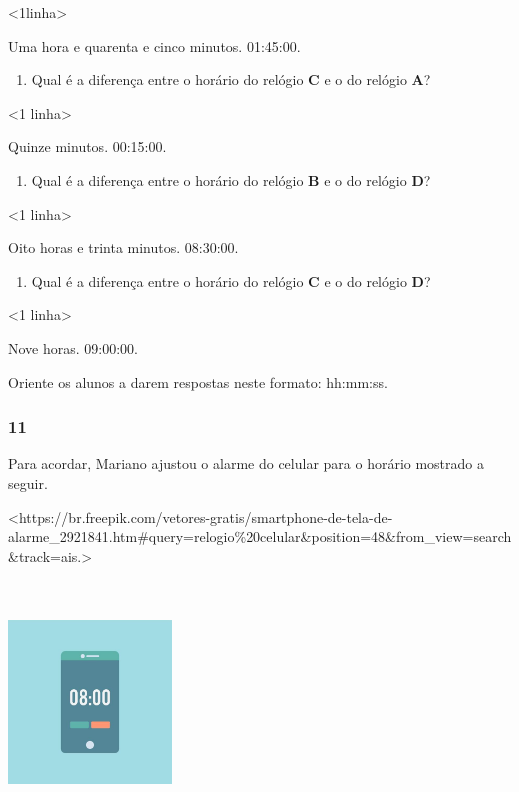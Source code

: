 \textless{}1linha\textgreater{}

Uma hora e quarenta e cinco minutos. 01:45:00.

\begin{enumerate}
\def\labelenumi{\Alph{enumi})}
\item
  Qual é a diferença entre o horário do relógio \textbf{C} e o do relógio \textbf{A}?
\end{enumerate}

\textless{}1 linha\textgreater{}

Quinze minutos. 00:15:00.

\begin{enumerate}
\def\labelenumi{\Alph{enumi})}
\item
  Qual é a diferença entre o horário do relógio \textbf{B} e o do relógio \textbf{D}?
\end{enumerate}

\textless{}1 linha\textgreater{}

Oito horas e trinta minutos. 08:30:00.

\begin{enumerate}
\def\labelenumi{\Alph{enumi})}
\item
  Qual é a diferença entre o horário do relógio \textbf{C} e o do relógio \textbf{D}?
\end{enumerate}

\textless{}1 linha\textgreater{}

Nove horas. 09:00:00.

Oriente os alunos a darem respostas neste formato: hh:mm:ss.

\subsubsection{11}\label{section-49}

Para acordar, Mariano ajustou o alarme do celular para o horário mostrado a seguir.

\textless{}https://br.freepik.com/vetores-gratis/smartphone-de-tela-de-alarme\_2921841.htm\#query=relogio\%20celular\&position=48\&from\_view=search\&track=ais.\textgreater{}

\includegraphics[width=1.70922in,height=2.53170in]{media/image39.jpg}


